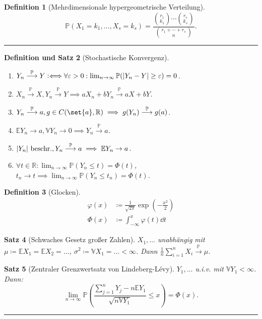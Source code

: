 \documentclass[a4paper]{article}
\newcounter{Sec}
\theoremstyle{marginbreak}
\newtheorem{definition}{Definition}[Sec]
\newtheorem{satz}[definition]{Satz}
\newtheorem{defsatz}[definition]{Definition und Satz}
\newcommand{\sep}{%
	\rule{\textwidth}{0.3pt}%
	\stepcounter{Sec}%
	}
\newcommand{\defiff}{\mathrel{\vcentcolon\Longleftrightarrow}}
\renewcommand{\P}{\mathbb{P}}
\newcommand{\R}{\mathbb{R}}
\newcommand{\E}{\mathbb{E}}
\newcommand{\V}{\mathbb{V}}
\renewcommand{\sc}{\mathrel{\stackrel{\P}{\longrightarrow}}}
\begin{document}
	\begin{definition}[Mehrdimensionale hypergeometrische Verteilung]
		\begin{equation*}
			\P(X_1=k_1,\ldots,X_s=k_s)=\frac{\binom{r_1}{k_1}\cdots\binom{r_s}{k_s}}{\binom{r_1+\cdots+r_s}{n}}.
		\end{equation*}
	\end{definition}
	\sep
	\begin{defsatz}[Stochastische Konvergenz]
		\begin{enumerate}[label=(\alph*)]
			\item $Y_n \sc Y\defiff \forall\varepsilon>0:\lim_{n\to\infty}\P(\abs{Y_n-Y}\geq\varepsilon) = 0$.
			\item $X_n \sc X, Y_n\sc Y\implies aX_n+bY_n\sc aX+bY$.
			\item $Y_n \sc a, g\in C(\set{a},\R)\implies g(Y_n)\sc g(a)$.
			\item $\E Y_n\to a, \V Y_n\to 0\implies Y_n\sc a$.
			\item $\abs{Y_n}~\text{beschr.}, Y_n\sc a\implies \E Y_n\to a$.
			\item $\forall t\in\R:\lim_{n\to\infty} \P(Y_n\leq t)=\Phi(t)$, $t_n\to t\implies \lim_{n\to\infty}\P(Y_n\leq t_n)=\Phi(t)$.
		\end{enumerate}
	\end{defsatz}
	\begin{definition}[Glocken]
		\begin{align*}
			\varphi(x) &\coloneqq \frac{1}{\sqrt{2\pi}}\exp(-\frac{x^2}{2})\\
			\Phi(x) &\coloneqq \int_{-\infty}^x \varphi(t)\dd{t}
		\end{align*}
	\end{definition}
	\begin{satz}[Schwaches Gesetz großer Zahlen]
		$X_1,\ldots$ unabhängig mit $\mu\coloneqq \E X_1 = \E X_2 = \ldots$, $\sigma^2\coloneqq \V X_1 = \ldots < \infty$.
		Dann $\frac{1}{n}\sum_{i=1}^n X_i \sc \mu$.
	\end{satz}
	\begin{satz}[Zentraler Grenzwertsatz von Lindeberg-Lévy]
		$Y_1,\ldots$ u.i.v. mit $\V Y_1<\infty$. Dann:
		\begin{equation*}
			\lim_{n\to\infty} \P\left(\frac{\sum_{j=1}^nY_j - n\E Y_1}{\sqrt{n\V Y_1}}\leq x\right) = \Phi(x).
		\end{equation*}
	\end{satz}
	\sep
\end{document}

